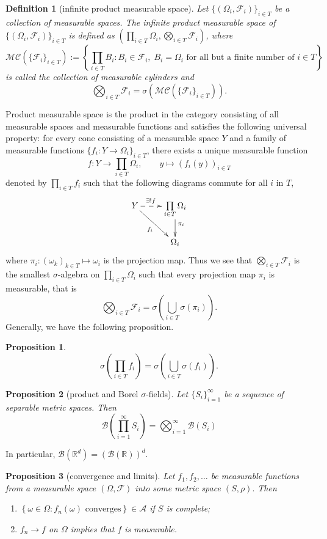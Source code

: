 \documentclass{report}
\newtheorem{definition}{Definition}[section]
\newtheorem{proposition}{Proposition}[section]
\theoremstyle{nonumberplain}
\begin{document}
\begin{definition}[infinite product measurable space]
	Let $\{(\Omega_i,\mathcal{F}_i)\}_{i\in T}$ be a collection of measurable spaces. The \emph{infinite product measurable space} of $\{(\Omega_i,\mathcal{F}_i)\}_{i\in T}$ is defined as $\left(\prod_{i\in T}\Omega_i,\bigotimes_{i\in T}\mathcal{F}_i\right)$, where
	\[
	\mathcal{MC}(\{\mathcal{F}_i\}_{i\in T}):=\left\{\prod_{i\in T}B_i:B_i\in \mathcal{F}_i,\;B_i=\Omega_i\text{ for all but a finite number of }i\in T\right\}
	\]
	is called the collection of \emph{measurable cylinders} and
	\[
	\bigotimes_{i\in T}\mathcal{F}_i=\sigma\left(\mathcal{MC}\left(\{\mathcal{F}_i\}_{i\in T}\right)\right).
	\] 
\end{definition}
Product measurable space is the product in the category consisting of all measurable spaces and measurable functions and satisfies the following universal property: for every cone consisting of a measurable space $Y$ and a family of measurable functions $\{f_i : Y \to \Omega_i\}_{i\in T}$, there exists a unique measurable function 
$$
f : Y \longrightarrow \prod_{i\in T}\Omega_i,\qquad y\longmapsto(f_i(y))_{i\in T}
$$ 
denoted by $\prod_{i\in T}f_i$ such that the following diagrams commute for all $i$ in $T$,
\[\xymatrix{
	Y\ar@{-->}[r]^{\exists!f\quad}\ar[rd]_{f_i}  &\prod\limits_{i\in T}\ar[d]^{\pi_i}\Omega_i\\
	&\Omega_i   
}\]
where $\pi_i:(\omega_k)_{k\in T}\mapsto \omega_i$ is the projection map. Thus we see that $\bigotimes_{i\in T}\mathcal{F}_i$ is the smallest $\sigma$-algebra on $\prod_{i\in T}\Omega_i$ such that every projection map $\pi_i$ is measurable, that is
\[
\bigotimes_{i\in T}\mathcal{F}_i=\sigma\left(\bigcup_{i\in T}\sigma\left(\pi_i\right)\right).
\]
Generally, we have the following proposition.
\begin{proposition}
	\[
	\sigma\left(\prod_{i\in T}f_i\right)=\sigma\left(\bigcup_{i\in T}\sigma\left(f_i\right)\right).
	\]
\end{proposition}

\begin{proposition}[product and Borel $\sigma$-fields]
	Let $\{S_i\}_{i=1}^\infty$ be a sequence of separable metric spaces. Then
	\[
	\mathcal{B}\left(\prod_{i=1}^\infty S_{i} \right)=\bigotimes_{i=1}^\infty\mathcal{B}\left(S_{i}\right)
	\]
\end{proposition}
In particular, $\mathcal{B}\left(\mathbb{R}^{d}\right)=(\mathcal{B}(\mathbb{R}))^{d}$.
\begin{proposition}[convergence and limits]
	Let $f_{1}, f_{2}, \ldots$ be measurable functions from a measurable space $(\Omega, \mathcal{F})$ into some metric space $(S, \rho) .$ Then
	\begin{enumerate}
		\item[(i)] $\left\{\omega\in\Omega:f_{n}(\omega) \text { converges}\right\} \in \mathcal{A}$ if $S$ is complete;
		\item[(ii)] $f_{n} \rightarrow f$ on $\Omega$ implies that $f$ is measurable.
	\end{enumerate}
\end{proposition}
\end{document}
